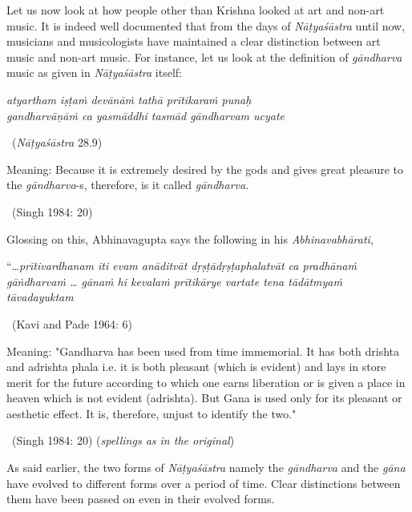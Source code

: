 Let us now look at how people other than Krishna looked at art and non-art music. It is indeed well documented that from the days of \textit{Nāṭyaśāstra} until now, musicians and musicologists have maintained a clear distinction between art music and non-art music. For instance, let us look at the definition of \textit{gāndharva} music as given in \textit{Nāṭyaśāstra} itself:

\begin{myquote}
\textit{atyartham iṣṭaṁ devānāṁ tathā prītikaraṁ punaḥ }\\ \textit{gandharvāṇāṁ ca yasmāddhi tasmād gāndharvam ucyate } 

~\hfill (\textit{Nāṭyaśāstra} 28.9)
\end{myquote}

\begin{myquote}
Meaning: Because it is extremely desired by the gods and gives great pleasure to the \textit{gāndharva}-s, therefore, is it called \textit{gāndharva}. 

~\hfill (Singh 1984: 20)
\end{myquote}

Glossing on this, Abhinavagupta says the following in his \textit{Abhinavabhārati},

\begin{myquote}
“…\textit{prītivardhanam iti evam anāditvāt dṛṣṭādṛṣṭaphalatvāt ca pradhānaṁ gāṅdharvaṁ … gānaṁ hi kevalaṁ prītikārye vartate  tena tādātmyaṁ tāvadayuktam } 

~\hfill (Kavi and Pade 1964: 6)
\end{myquote}

\begin{myquote}
Meaning: "Gandharva has been used from time immemorial. It has both drishta and adrishta phala i.e. it is both pleasant (which is evident) and lays in store merit for the future according to which one earns liberation or is given a place in heaven which is not evident (adrishta). But Gana is used only for its pleasant or aesthetic effect. It is, therefore, unjust to identify the two." 

~\hfill (Singh 1984: 20) (\textit{spellings as in the original})
\end{myquote}

As said earlier, the two forms of \textit{Nāṭyaśāstra} namely the \textit{gāndharva} and the \textit{gāna} have evolved to different forms over a period of time. Clear distinctions between them have been passed on even in their evolved forms.

